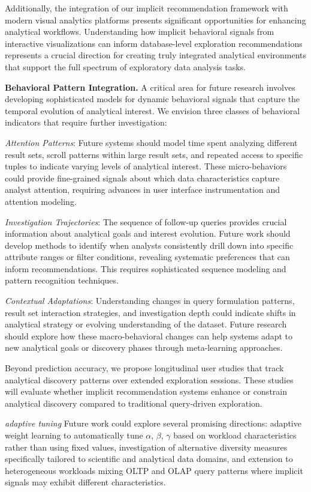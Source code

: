 \documentclass[sigconf, nonacm]{acmart}
\begin{document}
Additionally, the integration of our implicit recommendation framework with modern visual analytics platforms presents significant opportunities for enhancing analytical workflows. Understanding how implicit behavioral signals from interactive visualizations can inform database-level exploration recommendations represents a crucial direction for creating truly integrated analytical environments that support the full spectrum of exploratory data analysis tasks.

\textbf{Behavioral Pattern Integration.} A critical area for future research involves developing sophisticated models for dynamic behavioral signals that capture the temporal evolution of analytical interest. We envision three classes of behavioral indicators that require further investigation:

\textit{Attention Patterns}: Future systems should model time spent analyzing different result sets, scroll patterns within large result sets, and repeated access to specific tuples to indicate varying levels of analytical interest. These micro-behaviors could provide fine-grained signals about which data characteristics capture analyst attention, requiring advances in user interface instrumentation and attention modeling.

\textit{Investigation Trajectories}: The sequence of follow-up queries provides crucial information about analytical goals and interest evolution. Future work should develop methods to identify when analysts consistently drill down into specific attribute ranges or filter conditions, revealing systematic preferences that can inform recommendations. This requires sophisticated sequence modeling and pattern recognition techniques.

\textit{Contextual Adaptations}: Understanding changes in query formulation patterns, result set interaction strategies, and investigation depth could indicate shifts in analytical strategy or evolving understanding of the dataset. Future research should explore how these macro-behavioral changes can help systems adapt to new analytical goals or discovery phases through meta-learning approaches.

Beyond prediction accuracy, we propose longitudinal user studies that track analytical discovery patterns over extended exploration sessions. These studies will evaluate whether implicit recommendation systems enhance or constrain analytical discovery compared to traditional query-driven exploration. 

\textit{adaptive tuning} Future work could explore several promising directions: adaptive weight learning to automatically tune $\alpha$, $\beta$, $\gamma$ based on workload characteristics rather than using fixed values, investigation of alternative diversity measures specifically tailored to scientific and analytical data domains, and extension to heterogeneous workloads mixing OLTP and OLAP query patterns where implicit signals may exhibit different characteristics.

\begin{acks}
\end{acks}




\end{document}
